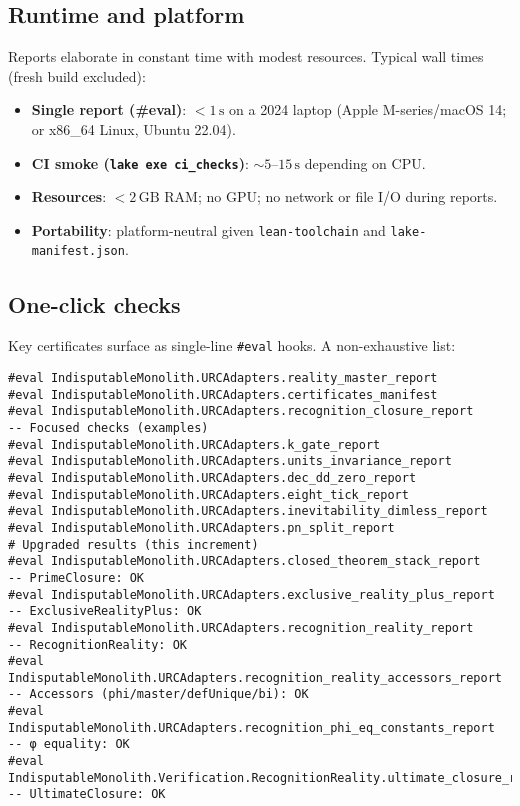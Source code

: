 \documentclass[11pt,a4paper,twoside]{article}
\numberwithin{equation}{section}
\theoremstyle{customthm}
\theoremstyle{customdef}
\theoremstyle{customrem}
\begin{document}
\subsection{Runtime and platform}\label{subsec:repro-runtime}
Reports elaborate in constant time with modest resources. Typical wall times (fresh build excluded):
\begin{itemize}[leftmargin=*]
  \item \textbf{Single report (\#eval)}: \(<1\,\mathrm{s}\) on a 2024 laptop (Apple M-series/macOS 14; or x86\_64 Linux, Ubuntu 22.04).
  \item \textbf{CI smoke (\texttt{lake exe ci\_checks})}: \(\sim 5\text{--}15\,\mathrm{s}\) depending on CPU.
  \item \textbf{Resources}: \(<2\,\mathrm{GB}\) RAM; no GPU; no network or file I/O during reports.
  \item \textbf{Portability}: platform-neutral given \texttt{lean-toolchain} and \texttt{lake-manifest.json}.
\end{itemize}

\subsection{One-click checks}\label{subsec:repro-oneclick}

Key certificates surface as single-line \texttt{\#eval} hooks. A non-exhaustive list:
\begin{lstlisting}
#eval IndisputableMonolith.URCAdapters.reality_master_report
#eval IndisputableMonolith.URCAdapters.certificates_manifest
#eval IndisputableMonolith.URCAdapters.recognition_closure_report
-- Focused checks (examples)
#eval IndisputableMonolith.URCAdapters.k_gate_report
#eval IndisputableMonolith.URCAdapters.units_invariance_report
#eval IndisputableMonolith.URCAdapters.dec_dd_zero_report
#eval IndisputableMonolith.URCAdapters.eight_tick_report
#eval IndisputableMonolith.URCAdapters.inevitability_dimless_report
#eval IndisputableMonolith.URCAdapters.pn_split_report
# Upgraded results (this increment)
#eval IndisputableMonolith.URCAdapters.closed_theorem_stack_report           -- PrimeClosure: OK
#eval IndisputableMonolith.URCAdapters.exclusive_reality_plus_report        -- ExclusiveRealityPlus: OK
#eval IndisputableMonolith.URCAdapters.recognition_reality_report           -- RecognitionReality: OK
#eval IndisputableMonolith.URCAdapters.recognition_reality_accessors_report -- Accessors (phi/master/defUnique/bi): OK
#eval IndisputableMonolith.URCAdapters.recognition_phi_eq_constants_report  -- φ equality: OK
#eval IndisputableMonolith.Verification.RecognitionReality.ultimate_closure_report -- UltimateClosure: OK
\end{lstlisting}
\end{document}
